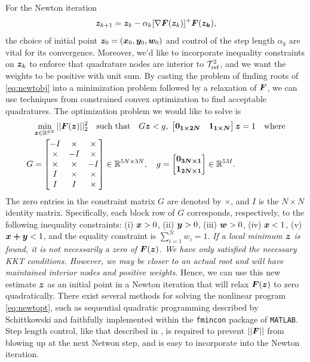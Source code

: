 For the Newton iteration 
\begin{equation}
	\boldsymbol{z}_{k+1} = \boldsymbol{z}_k - \alpha_k[\nabla \boldsymbol{F}(\boldsymbol{z}_k)]^+\boldsymbol{F}(\boldsymbol{z_k}),
\end{equation}
the choice of initial point $\boldsymbol{z}_0 = (\boldsymbol{x}_0,\boldsymbol{y}_0,\boldsymbol{w}_0)$ and control of the step length $\alpha_k$ are vital for its convergence. Moreover, we'd like to incorporate inequality constraints on $\boldsymbol{z}_k$ to enforce that quadrature nodes are interior to $\mathcal{T}_{\text{ref}}^2$, and we want the weights to be positive with unit sum. By casting the problem of finding roots of \eqref{eq:newtobj} into a minimization problem followed by a relaxation of $\boldsymbol{F}$, we can use techniques from constrained convex optimization to find acceptable quadratures. The optimization problem we would like to solve is 
\begin{equation}\label{eq:newtopt}
\begin{split}
&\min_{\boldsymbol{z} \in \mathbb{R}^{3N}}||\boldsymbol{F}(\boldsymbol{z})||_2^2 \quad\text{such that}\quad G\boldsymbol{z} < g,\; \begin{bmatrix} \boldsymbol{0_{1\times 2N}} & \boldsymbol{1_{1\times N}}\end{bmatrix}\boldsymbol{z} = 1 \quad\text{where}\\ G &= \begin{bmatrix} -I & \times & \times \\\times & -I & \times \\ \times &\times  & -I \\ I & \times & \times \\ I & I & \times \end{bmatrix} \in \mathbb{R}^{5N\times 3N},\quad
g = \begin{bmatrix} \boldsymbol{0_{3N\times 1}} \\ \boldsymbol{1_{2N\times 1}} \end{bmatrix} \in \mathbb{R}^{5M}.
\end{split}
\end{equation}
The zero entries in the constraint matrix $G$ are denoted by $\times$, and $I$ is the $N\times N$ identity matrix. Specifically, each block row of $G$ corresponds, respectively, to the following inequality constraints: (i) $\boldsymbol{x} > 0$, (ii) $\boldsymbol{y} > 0$, (iii) $\boldsymbol{w} > 0$, (iv) $\boldsymbol{x} < 1$, (v) $\boldsymbol{x+y} < 1$, and the equality constraint is $\sum_{i=1}^N w_i = 1$. \emph{If a local minimum $\boldsymbol{z}$ is found, it is not necessarily a zero of $\boldsymbol{F}(\boldsymbol{z})$. We have only satisfied the necessary KKT conditions. However, we may be closer to an actual root and will have maintained interior nodes and positive weights}. Hence, we can use this new estimate $\boldsymbol{z}$ as an initial point in a Newton iteration that will relax $\boldsymbol{F}(\boldsymbol{z})$ to zero quadratically. There exist several methods for solving the nonlinear program \eqref{eq:newtopt}, such as sequential quadratic programming described by Schittkowski \cite{sqp} and faithfully implemented within the \texttt{fmincon} package of \texttt{MATLAB}. Step length control, like that described in \cite{polyak}, is required to prevent $||\boldsymbol{F}||$ from blowing up at the next Netwon step, and is easy to incorporate into the Newton iteration.
